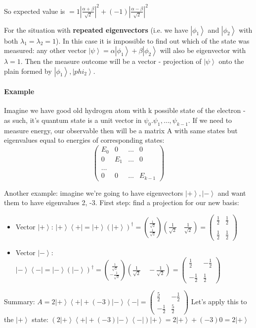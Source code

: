 \documentclass{scrartcl}
\newcommand{\ket}[1]{\left| #1 \right>} %
\newcommand{\bra}[1]{\left< #1 \right|} %
\begin{document}
So expected value is $= 1 \left| \frac{\alpha + \beta}{\sqrt2}\right| ^2 +
(-1)\left| \frac{\alpha - \beta}{\sqrt2}\right| ^2$

For the situation with {\bf repeated eigenvectors} (i.e. we have $\ket{\phi_1}$
and $\ket{\phi_2}$ with both $\lambda_1 = \lambda_2 = 1$). In this case it is
impossible to find out which of the state was measured: any other vector
$\ket\psi = \alpha\ket{\phi_1} + \beta\ket{\phi_2}$ will also be eigenvector
with $\lambda = 1$. Then the measure outcome will be a vector - projection of
$\ket\psi$ onto the plain formed by $\ket{\phi_1}, \ket{phi_2}$.

\paragraph{Example}

Imagine we have good old hydrogen atom with k possible state of the electron -
as such, it's quantum state is a unit vector in $\psi_0. \psi_1, \dots,
\psi_{k-1}$. If we need to measure energy, our observable then will be a matrix
A with same states but eigenvalues equal to energies of corresponding states:
$$\begin{pmatrix} E_0 & 0 & \dots & 0 \\ 0 & E_1 & \dots & 0 \\ \\ \dots \\ 0 & 0 & \dots & E_{k-1} \end{pmatrix}$$

Another example: imagine we're going to have eigenvectors $\ket+, \ket-$ and
want them to have eigenvalues 2, -3. First step: find a projection for our new
basis:
\begin{itemize}
\item Vector $\ket+$: $\ket+\bra+ = \ket+ (\ket+)^\dag =
  \binom{\frac1{\sqrt2}}{\frac1{\sqrt2}} (\frac1{\sqrt2} \quad \frac1{\sqrt2})
  = \begin{pmatrix} \frac12 & \frac12 \\ \\ \frac12 & \frac12 \end{pmatrix}$
\item Vector $\ket-$: $\ket-\bra- = \ket- (\ket-)^\dag =
  \binom{\frac1{\sqrt2}}{-\frac1{\sqrt2}} (\frac1{\sqrt2} \quad -\frac1{\sqrt2})
  = \begin{pmatrix} \frac12 & -\frac12 \\ \\ -\frac12 & \frac12 \end{pmatrix}$
\end{itemize}
Summary: $A = 2 \ket+\bra+ + (-3) \ket-\bra- =
\begin{pmatrix} \frac52 & -\frac12 \\ -\frac12 & \frac52 \end{pmatrix} $ Let's
apply this to the $\ket+$ state: $(2 \ket+\bra+ + (-3) \ket-\bra-)\ket+ = 2\ket+
+ (-3) 0 = 2 \ket+$
\end{document}
